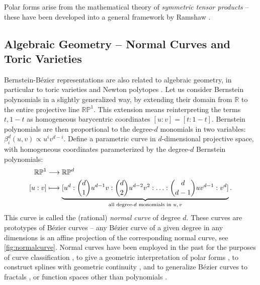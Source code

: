\documentclass[final,3p,mathptmx]{elsarticle}
\begin{document}
Polar forms arise from the mathematical theory of \emph{symmetric tensor products} -- these have been developed into a general  framework by Ramshaw \cite{ramshaw2001paired}.

\subsection{Algebraic Geometry -- Normal Curves and Toric Varieties}\label{sec:motivation:newton}

Bernstein-B\'{e}zier representations are also related to algebraic geometry, in particular to toric varieties and Newton polytopes \cite{sottile2015algebraic}. Let us consider Bernstein polynomials in a slightly generalized way, by extending their domain from $\mathbb{R}$ to the entire projective line $\mathbb{RP}^{1}$.  This extension means reinterpreting the terms $t,1-t$ as homogeneous barycentric coordinates $[u:v] = [t:1-t]$. Bernstein polynomials are then proportional to the  degree-$d$ monomials in two variables: $\beta^{d}_{i}(u,v) \propto u^{i}v^{d-i}$. Define a parametric curve in $d$-dimensional projective space, with homogeneous coordinates parameterized by the degree-$d$ Bernstein polynomials:
\begin{align}\label{eq:veronese} \notag \mathbb{RP}^{1} & \longrightarrow \mathbb{RP}^{d} \\
\left[u : v\right] & \longmapsto \underbrace{[u^{d} : {d \choose 1}u^{d-1}v : {d \choose 2}u^{d-2}v^{2} : \ldots : {d \choose d-1}u v^{d-1} : v^{d}]}_{\text{all degree-$d$ monomials in $u,v$}}. \end{align}
This curve is called the (rational) \emph{normal curve} of degree $d$. These curves are prototypes of B\'{e}zier curves -- any B\'{e}zier curve of a given degree in any dimensions is an affine projection of the corresponding normal curve, see \autoref{fig:normalcurve}. Normal curves have been employed in the past for the purposes of curve classification \cite{degen1988some,pottmann1992classification}, to give a geometric interpretation of polar forms \cite{mazure1999blossoming}, to construct splines with geometric continuity \cite{seidel1993polar}, and to generalize B\'{e}zier curves to fractals \cite{goldman2004fractal}, or function spaces other than polynomials \cite{pottmann1993geometry}. 
\end{document}
